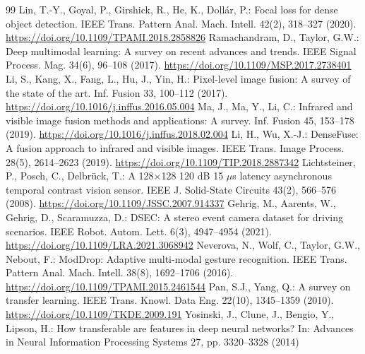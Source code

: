 \begin{thebibliography}{99}
 Lin, T.-Y., Goyal, P., Girshick, R., He, K., Doll\'{a}r, P.: Focal loss for dense object detection. IEEE Trans. Pattern Anal. Mach. Intell. 42(2), 318--327 (2020). \url{https://doi.org/10.1109/TPAMI.2018.2858826}
 Ramachandram, D., Taylor, G.W.: Deep multimodal learning: A survey on recent advances and trends. IEEE Signal Process. Mag. 34(6), 96--108 (2017). \url{https://doi.org/10.1109/MSP.2017.2738401}
 Li, S., Kang, X., Fang, L., Hu, J., Yin, H.: Pixel-level image fusion: A survey of the state of the art. Inf. Fusion 33, 100--112 (2017). \url{https://doi.org/10.1016/j.inffus.2016.05.004}
 Ma, J., Ma, Y., Li, C.: Infrared and visible image fusion methods and applications: A survey. Inf. Fusion 45, 153--178 (2019). \url{https://doi.org/10.1016/j.inffus.2018.02.004}
 Li, H., Wu, X.-J.: DenseFuse: A fusion approach to infrared and visible images. IEEE Trans. Image Process. 28(5), 2614--2623 (2019). \url{https://doi.org/10.1109/TIP.2018.2887342}
 Lichtsteiner, P., Posch, C., Delbr\"uck, T.: A 128$\times$128 120 dB 15 $\mu$s latency asynchronous temporal contrast vision sensor. IEEE J. Solid-State Circuits 43(2), 566--576 (2008). \url{https://doi.org/10.1109/JSSC.2007.914337}
 Gehrig, M., Aarents, W., Gehrig, D., Scaramuzza, D.: DSEC: A stereo event camera dataset for driving scenarios. IEEE Robot. Autom. Lett. 6(3), 4947--4954 (2021). \url{https://doi.org/10.1109/LRA.2021.3068942}
 Neverova, N., Wolf, C., Taylor, G.W., Nebout, F.: ModDrop: Adaptive multi-modal gesture recognition. IEEE Trans. Pattern Anal. Mach. Intell. 38(8), 1692--1706 (2016). \url{https://doi.org/10.1109/TPAMI.2015.2461544}
 Pan, S.J., Yang, Q.: A survey on transfer learning. IEEE Trans. Knowl. Data Eng. 22(10), 1345--1359 (2010). \url{https://doi.org/10.1109/TKDE.2009.191}
 Yosinski, J., Clune, J., Bengio, Y., Lipson, H.: How transferable are features in deep neural networks? In: Advances in Neural Information Processing Systems 27, pp. 3320--3328 (2014)
\end{thebibliography}

